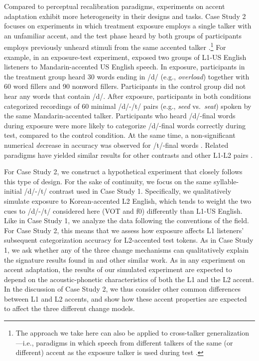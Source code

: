 \documentclass[
  11pt,
  man,floatsintext]{apa6}
\begin{document}
Compared to perceptual recalibration paradigms, experiments on accent adaptation exhibit more heterogeneity in their designs and tasks. Case Study 2 focuses on experiments in which treatment exposure employs a single talker with an unfamiliar accent, and the test phase heard by both groups of participants employs previously unheard stimuli from the same accented talker \autocites[e.g.,][]{eisner2013,schertz2015,xie2017}.\footnote{The approach we take here can also be applied to cross-talker generalization---i.e., paradigms in which speech from different talkers of the same (or different) accent as the exposure talker is used during test \autocite{baeseberk2013,bradlow-bent2008,sidaras2009}.} For example, in an exposure-test experiment, \textcite{xie2016jep} exposed two groups of L1-US English listeners to Mandarin-accented US English speech. In exposure, participants in the treatment group heard 30 words ending in /d/ (e.g., \emph{overload}) together with 60 word fillers and 90 nonword fillers. Participants in the control group did not hear any words that contain /d/. After exposure, participants in both conditions categorized recordings of 60 minimal /d/-/t/ pairs (e.g., \emph{seed} vs.~\emph{seat}) spoken by the same Mandarin-accented talker. Participants who heard /d/-final words during exposure were more likely to categorize /d/-final words correctly during test, compared to the control condition. At the same time, a non-significant numerical \emph{de}crease in accuracy was observed for /t/-final words \autocite[see also][]{xie2018lcn}. Related paradigms have yielded similar results for other contrasts and other L1-L2 pairs \autocites[e.g.,][]{zheng-samuel2020,eisner2013}.

For Case Study 2, we construct a hypothetical experiment that closely follows this type of design. For the sake of continuity, we focus on the same syllable-initial /d/-/t/ contrast used in Case Study 1. Specifically, we qualitatively simulate exposure to Korean-accented L2 English, which tends to weight the two cues to /d/-/t/ considered here (VOT and f0) differently than L1-US English. Like in Case Study 1, we analyze the data following the conventions of the field. For Case Study 2, this means that we assess how exposure affects L1 listeners' subsequent categorization accuracy for L2-accented test tokens. As in Case Study 1, we ask whether any of the three change mechanisms can qualitatively explain the signature results found in \textcite{xie2016jep} and other similar work. As in any experiment on accent adaptation, the results of our simulated experiment are expected to depend on the acoustic-phonetic characteristics of both the L1 and the L2 accent. In the discussion of Case Study 2, we thus consider other common differences between L1 and L2 accents, and show how these accent properties are expected to affect the three different change models.
\end{document}
